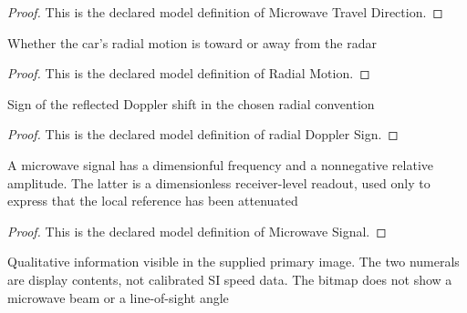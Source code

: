 \begin{proof}
  This is the declared model definition of Microwave Travel Direction.
\end{proof}
\begin{definition}
  \label{def:physics:phyx-mini-0525:phyxminiproblems-problemphyxmini0525-radialmotion}
  Whether the car's radial motion is toward or away from the radar
\end{definition}
\begin{proof}
  This is the declared model definition of Radial Motion.
\end{proof}
\begin{definition}
  \label{def:physics:phyx-mini-0525:phyxminiproblems-problemphyxmini0525-radialdopplersign}
  Sign of the reflected Doppler shift in the chosen radial convention
\end{definition}
\begin{proof}
  This is the declared model definition of radial Doppler Sign.
\end{proof}
\begin{definition}
  \label{def:physics:phyx-mini-0525:phyxminiproblems-problemphyxmini0525-microwavesignal}
  A microwave signal has a dimensionful frequency and a nonnegative relative amplitude. The latter is a dimensionless receiver-level readout, used only to express that the local reference has been attenuated
\end{definition}
\begin{proof}
  This is the declared model definition of Microwave Signal.
\end{proof}
\begin{definition}
  \label{def:physics:phyx-mini-0525:phyxminiproblems-problemphyxmini0525-roadsideradarfigure}
  Qualitative information visible in the supplied primary image. The two numerals are display contents, not calibrated SI speed data. The bitmap does not show a microwave beam or a line-of-sight angle
\end{definition}
